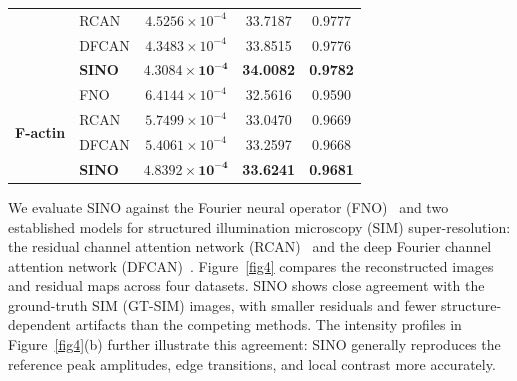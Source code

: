 \documentclass[preprint,numbers,sort&compress]{elsarticle}
\begin{document}
{\begin{table}[t]
\begin{tabular}{llccc}
						& RCAN   
						& $4.5256\times10^{-4}$ 
						& 33.7187 
						& 0.9777 \\
						
						& DFCAN  
						& $4.3483\times10^{-4}$ 
						& 33.8515 
						& 0.9776 \\
						
						\rowcolor{gray!18}
						& \textbf{SINO} 
						& $\mathbf{4.3084\times10^{-4}}$ 
						& \textbf{34.0082} 
						& \textbf{0.9782} \\
						
						\midrule
						
						\multirow{4}{*}{\textbf{F-actin}}
						& FNO    
						& $6.4144\times10^{-4}$ 
						& 32.5616 
						& 0.9590 \\
						
						& RCAN   
						& $5.7499\times10^{-4}$ 
						& 33.0470 
						& 0.9669 \\
						
						& DFCAN  
						& $5.4061\times10^{-4}$ 
						& 33.2597 
						& 0.9668 \\
						
						\rowcolor{gray!18}
						& \textbf{SINO} 
						& $\mathbf{4.8392\times10^{-4}}$ 
						& \textbf{33.6241} 
						& \textbf{0.9681} \\
						
						\bottomrule
					\end{tabular}
			\end{table}}
			
			We evaluate SINO against the Fourier neural operator (FNO)~\cite{li2020fourier} and two established models for structured illumination microscopy (SIM) super-resolution: the residual channel attention network (RCAN)~\cite{zhang2018image} and the deep Fourier channel attention network (DFCAN)~\cite{qiao2021evaluation}. Figure~\ref{fig4} compares the reconstructed images and residual maps across four datasets. SINO shows close agreement with the ground-truth SIM (GT-SIM) images, with smaller residuals and fewer structure-dependent artifacts than the competing methods. The intensity profiles in Figure~\ref{fig4}(b) further illustrate this agreement: SINO generally reproduces the reference peak amplitudes, edge transitions, and local contrast more accurately.
			
\end{document}

